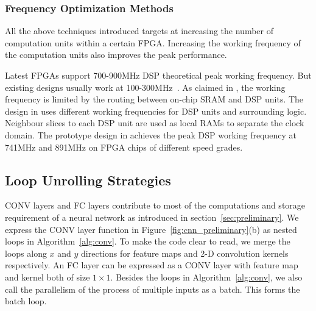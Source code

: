 \subsubsection{Frequency Optimization Methods}
All the above techniques introduced targets at increasing the number of computation units within a certain FPGA. Increasing the working frequency of the computation units also improves the peak performance.

Latest FPGAs support 700-900MHz DSP theoretical peak working frequency. But existing designs usually work at 100-300MHz~\cite{qiu2016going, guo2017angel, zhang2016caffeine, ma2017optimizing}. As claimed in \cite{wu2017high}, the working frequency is limited by the routing between on-chip SRAM and DSP units. The design in \cite{wu2017high} uses different working frequencies for DSP units and surrounding logic. Neighbour slices to each DSP unit are used as local RAMs to separate the clock domain. The prototype design in \cite{wu2017high} achieves the peak DSP working frequency at 741MHz and 891MHz on FPGA chips of different speed grades. 

\subsection{Loop Unrolling Strategies}\label{sec:hardware:lu}
CONV layers and FC layers contribute to most of the computations and storage requirement of a neural network as introduced in section~\ref{sec:preliminary}. We express the CONV layer function in Figure~\ref{fig:cnn_preliminary}(b) as nested loops in Algorithm~\ref{alg:conv}. To make the code clear to read, we merge the loops along $x$ and $y$ directions for feature maps and 2-D convolution kernels respectively. An FC layer can be expressed as a CONV layer with feature map and kernel both of size $1\times 1$. Besides the loops in Algorithm~\ref{alg:conv}, we also call the parallelism of the process of multiple inputs as a batch. This forms the batch loop.

